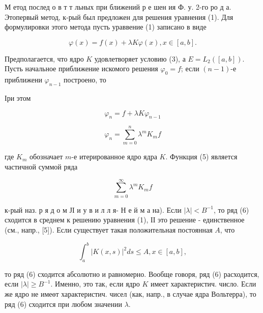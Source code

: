 \documentclass[10pt]{article}
\begin{document}
М етод послед о в т т льных при ближений р е шен ия Ф. у. 2-го ро д а. Этопервый метод, к-рый был предложен для решения уравнения (1). Для формулировки этого метода пусть ураввение (1) записано в виде



\[

\varphi(x)=f(x)+\lambda K \varphi(x), x \in[a, b] .

\]



Предполагается, что ядро $K$ удовлетворяет условию (3), а $E=L_{2}([a, b])$. Пусть начальное приближение искомого решения $\varphi_{0}=f$; если $(n-1)$-е приближени $\varphi_{n-1}$ построено, то



Іри этом



\[

\varphi_{n}=f+\lambda K \varphi_{n-1}

\]



\[

\varphi_{n}=\sum_{m=0}^{n} \lambda^{m} K_{m} f

\]



где $K_{m}$ обозначает $m$-е итерированное ядро ядра $K$. Функция (5) является частичной суммой ряда



\[

\sum_{m=0}^{\infty} \lambda^{m} K_{m} f

\]



к-рый наз. р я д о м ЈІ и у в и л л я- Н е й м а на). Если $|\lambda|<B^{-1}$, то ряд (6) сходится в среднем к решению уравнения (1), ІІ это решение - единственное (см., напр., [5]). Если существует такая положительная постоянная $A$, что



\[

\int_{a}^{b}|K(x, s)|^{2} d s \leqslant A, x \in[a, b],

\]



то ряд (6) сходится абсолютно и равномерно. Вообще говоря, ряд (6) расходится, если $|\lambda| \geqslant B^{-1}$. Именно, это так, если ядро $K$ имеет характеристич. число. Если же ядро не имеөт характеристич. чисел (как, напр., в случае ядра Вольтерра), то ряд (6) сходится при любом значении $\lambda$.
\end{document}
